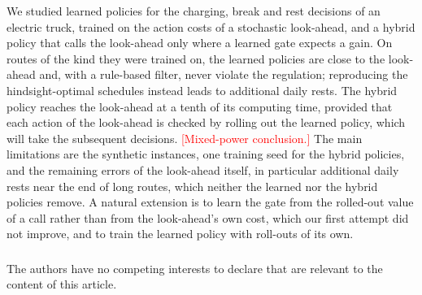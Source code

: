 \documentclass[runningheads]{llncs}
\newcommand{\tbd}[1]{\textcolor{red}{[#1]}}
\begin{document}
We studied learned policies for the charging, break and rest decisions of an
electric truck, trained on the action costs of a stochastic look-ahead, and a
hybrid policy that calls the look-ahead only where a learned gate expects a
gain. On routes of the kind they were trained on, the learned policies are
close to the look-ahead and, with a rule-based filter, never violate the
regulation; reproducing the hindsight-optimal schedules instead leads to
additional daily rests. The hybrid policy reaches the look-ahead at a tenth of
its computing time, provided that each action of the look-ahead is checked by
rolling out the learned policy, which will take the subsequent decisions.
\tbd{Mixed-power conclusion.} The main limitations are the synthetic
instances, one training seed for the hybrid policies, and the remaining errors
of the look-ahead itself, in particular additional daily rests near the end of
long routes, which neither the learned nor the hybrid policies remove. A
natural extension is to learn the gate from the rolled-out value of a call
rather than from the look-ahead's own cost, which our first attempt did not
improve, and to train the learned policy with roll-outs of its own.

\begin{credits}
\subsubsection{\ackname}
\subsubsection{\discintname}
The authors have no competing interests to declare that are relevant to the
content of this article.
\end{credits}
%


\end{document}

